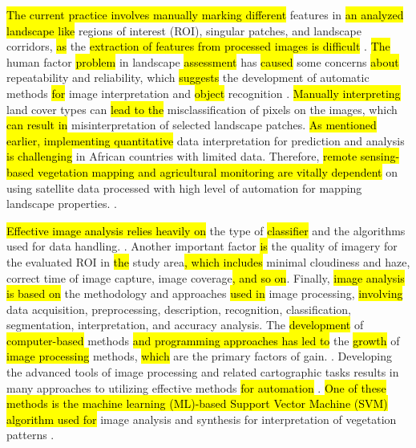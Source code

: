 \documentclass[earth,article,submit,pdftex,moreauthors]{Definitions/mdpi}
\begin{document}
\hl{The current practice involves manually marking different} features in \hl{an analyzed landscape like} regions of interest (ROI), singular patches, and landscape corridors, \hl{as} the \hl{extraction of features from processed images is difficult}
 \cite{CABRAL2017115}. \hl{The} human factor \hl{problem} in landscape \hl{assessment }has \hl{caused} some concerns \hl{about} repeatability and reliability, which \hl{suggests} the development of automatic methods \hl{for} image interpretation and \hl{object} recognition \cite{CONCHEDDA2008578,rs9020181,rs12091436}. \hl{Manually interpreting} land cover types can \hl{lead to the} misclassification of pixels on the images, which \hl{can result in} misinterpretation of selected landscape patches. \hl{As mentioned earlier, implementing quantitative} data interpretation for prediction and analysis \hl{is challenging} in African countries with limited data\cite{STOORVOGEL2009161}. Therefore, \hl{remote sensing-based vegetation mapping and agricultural monitoring are vitally dependent} on using satellite data processed with high level of automation for mapping landscape properties.
 \cite{PEREZHOYOS2020102064,BRANDT2016215}.  

\hl{Effective image analysis relies heavily on} the type of \hl{classifier} and the algorithms used for data handling. \cite{Lemenkova202212}. Another important factor \hl{is} the quality of imagery for the evaluated ROI in \hl{the} study area\hl{, which includes} minimal cloudiness and haze, correct time of image capture, image coverage\hl{, and so on}. Finally, \hl{image analysis is based on} the methodology and approaches \hl{used in} image processing, \hl{involving} data acquisition, preprocessing, description, recognition, classification, segmentation, interpretation, and accuracy analysis. The \hl{development} of \hl{computer-based} methods \hl{and programming approaches has led to} the \hl{growth} of \hl{image processing} methods, \hl{which} are the primary factors of gain. \cite{Duncan,jimaging9050098,Purkis,info14040249,DIOUF2001129}. Developing the advanced tools of image processing and related cartographic tasks results in many approaches to utilizing effective methods \hl{for automation} \cite{SUOMALAINEN2021112691,OlsonAnderson,Lemenkova202227,Ali,Olsonetal2019,Lemenkova202229}. \hl{One of these methods is the machine learning (ML)-based Support Vector Machine (SVM) algorithm used for} image analysis and synthesis for interpretation of vegetation patterns \cite{PUERTAS2013112,PETROPOULOS201170,ANEES2024102732,IBRAHIM2024100561}.
\end{document}
